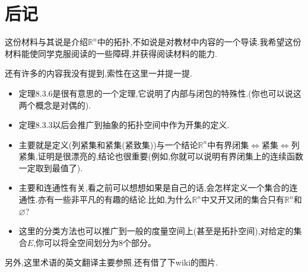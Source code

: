 \documentclass[12pt,A4paper,oneside]{amsart}
\numberwithin{equation}{section}
\theoremstyle{plain}
\theoremstyle{plain}
\theoremstyle{plain}
\numberwithin{equation}{section}
\theoremstyle{remark}
\begin{document}
\section{后记}
这份材料与其说是介绍$\mathbb{R}^n$中的拓扑,不如说是对教材\cite[8.3]{CS12}中内容的一个导读.我希望这份材料能使同学克服阅读\cite[8.3]{CS12}的一些障碍,并获得阅读材料\cite[Appendix A]{JM08}的能力.

还有许多的内容我没有提到,索性在这里一并提一提.
\begin{itemize}
	\item 定理8.3.6是很有意思的一个定理,它说明了内部与闭包的特殊性.(你也可以说这两个概念是对偶的).
	\item 定理8.3.3以后会推广到抽象的拓扑空间中作为开集的定义.
	\item \cite[8.4]{CS12}主要就是定义(列紧集和紧集(紧致集))与一个结论$\mathbb{R}^n$中有界闭集$\Leftrightarrow$紧集$\Leftrightarrow$列紧集,证明是很漂亮的,结论也很重要(例如,你就可以说明有界闭集上的连续函数一定取到最值了).
	\item \cite[8.5]{CS12}主要和连通性有关,看之前可以想想如果是自己的话,会怎样定义一个集合的连通性.亦有一些非平凡的有趣的结论.比如,为什么$\mathbb{R}^n$中又开又闭的集合只有$\mathbb{R}^n$和$\varnothing$?
	\item 这里的分类方法也可以推广到一般的度量空间上(甚至是拓扑空间),对给定的集合$E$,你可以将全空间划分为8个部分。
\end{itemize}
另外,这里术语的英文翻译主要参照\cite[Appendix A]{JM08}.还有借了下wiki的图片.











\end{document}
